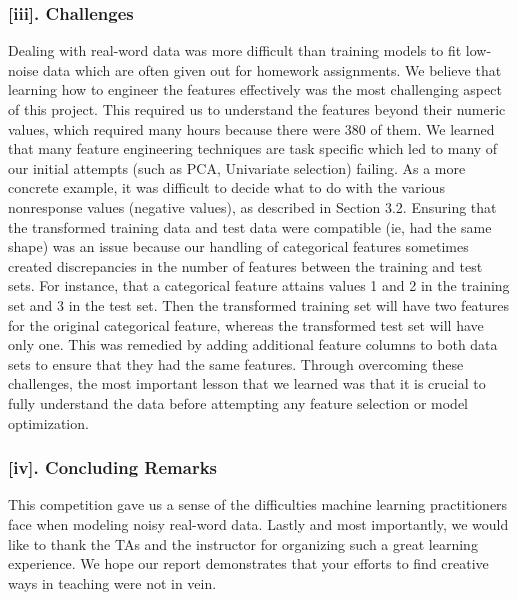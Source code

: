\subsubsection*{[iii]. Challenges}
Dealing with real-word data was more difficult than training models to fit low-noise data which are often given out for homework assignments. We believe that learning how to engineer the features effectively was the most challenging aspect of this project. This required us to understand the features beyond their numeric values, which required many hours because there were 380 of them. We learned that many feature engineering techniques are task specific which led to many of our initial attempts (such as PCA, Univariate selection) failing. As a more concrete example, it was difficult to decide what to do with the various nonresponse values (negative values), as described in Section 3.2. Ensuring that the transformed training data and test data were compatible (ie, had the same shape) was an issue because our handling of categorical features sometimes created discrepancies in the number of features between the training and test sets. For instance, that a categorical feature attains values 1 and 2 in the training set and 3 in the test set. Then the transformed training set will have two features for the original categorical feature, whereas the transformed test set will have only one. This was remedied by adding additional feature columns to both data sets to ensure that they had the same features. Through overcoming these challenges, the most important lesson that we learned was that it is crucial to fully understand the data before attempting any feature selection or model optimization. 

\subsubsection*{[iv]. Concluding Remarks}
This competition gave us a sense of the difficulties machine learning practitioners face when modeling noisy real-word data. Lastly and most importantly, we would like to thank the TAs and the instructor for organizing such a great learning experience. We hope our report demonstrates that your efforts to find creative ways in teaching were not in vein. 

















